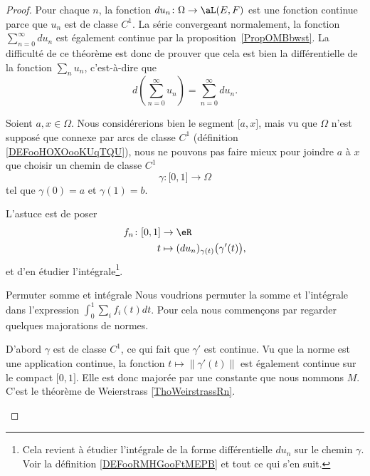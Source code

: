 \begin{proof}
	Pour chaque \( n\), la fonction \( du_n\colon \Omega\to \aL(E,F)\) est une fonction continue parce que \( u_n\) est de classe \( C^1\). La série convergeant normalement, la fonction \( \sum_{n=0}^{\infty}du_n\) est également continue par la proposition~\ref{PropOMBbwst}. La difficulté de ce théorème est donc de prouver que cela est bien la différentielle de la fonction \( \sum_nu_n\), c'est-à-dire que
	\begin{equation}
		d\left( \sum_{n=0}^{\infty}u_n \right)=\sum_{n=0}^{\infty}du_n.
	\end{equation}

	Soient \( a,x\in \Omega\). Nous considérerions bien le segment \( \mathopen[ a , x \mathclose]\), mais vu que \( \Omega\) n'est supposé que connexe par arcs de classe \( C^1\) (définition \ref{DEFooHOXOooKUqTQU}), nous ne pouvons pas faire mieux pour joindre \( a\) à \( x\) que choisir un chemin de classe \( C^1\)
	\begin{equation}
		\gamma\colon \mathopen[ 0 , 1 \mathclose]\to \Omega
	\end{equation}
	tel que \( \gamma(0)=a\) et \( \gamma(1)=b\).

	L'astuce est de poser
	\begin{equation}
		\begin{aligned}
			f_n\colon \mathopen[ 0 , 1 \mathclose] & \to \eR                                           \\
			t                                      & \mapsto (du_n)_{\gamma(t)}\big( \gamma'(t) \big),
		\end{aligned}
	\end{equation}
	et d'en étudier l'intégrale\footnote{Cela revient à étudier l'intégrale de la forme différentielle \( du_n\) sur le chemin \( \gamma\). Voir la définition \ref{DEFooRMHGooFtMEPB} et tout ce qui s'en suit.}.

	\begin{subproof}
		\item[Permuter somme et intégrale]
		Nous voudrions permuter la somme et l'intégrale dans l'expression \( \int_0^1\sum_if_i(t)dt\). Pour cela nous commençons par regarder quelques majorations de normes.

		D'abord \( \gamma\) est de classe \( C^1\), ce qui fait que \( \gamma'\) est continue. Vu que la norme est une application continue, la fonction \( t\mapsto \| \gamma'(t) \|\) est également continue sur le compact \( \mathopen[ 0 , 1 \mathclose]\). Elle est donc majorée par une constante que nous nommons \( M\). C'est le théorème de Weierstrass \ref{ThoWeirstrassRn}.


\end{subproof}
\end{proof}
